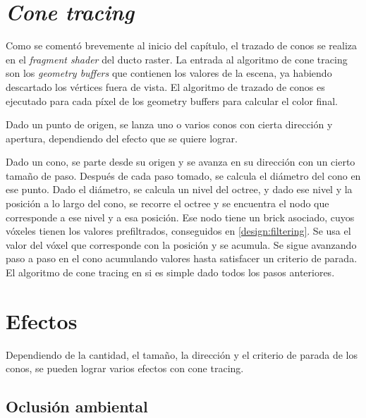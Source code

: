 
\section{\textit{Cone tracing}}\label{sec:cone_tracing}

Como se comentó brevemente al inicio del capítulo, el trazado de conos se realiza en el \textit{fragment shader} del ducto raster.
La entrada al algoritmo de cone tracing son los \textit{geometry buffers} que contienen los valores de la escena, ya habiendo descartado los vértices fuera de vista.
El algoritmo de trazado de conos es ejecutado para cada píxel de los geometry buffers para calcular el color final.

Dado un punto de origen, se lanza uno o varios conos con cierta dirección y apertura, dependiendo del efecto que se quiere lograr.

Dado un cono, se parte desde su origen y se avanza en su dirección con un cierto tamaño de paso.
Después de cada paso tomado, se calcula el diámetro del cono en ese punto.
Dado el diámetro, se calcula un nivel del octree, y dado ese nivel y la posición a lo largo del cono, se recorre el octree y se encuentra el nodo que corresponde a ese nivel y a esa posición.
Ese nodo tiene un brick asociado, cuyos vóxeles tienen los valores prefiltrados, conseguidos en \ref{design:filtering}.
Se usa el valor del vóxel que corresponde con la posición y se acumula.
Se sigue avanzando paso a paso en el cono acumulando valores hasta satisfacer un criterio de parada.
El algoritmo de cone tracing en si es simple dado todos los pasos anteriores.

\section{Efectos}

Dependiendo de la cantidad, el tamaño, la dirección y el criterio de parada de los conos, se pueden lograr varios efectos con cone tracing.

\subsection{Oclusión ambiental}

